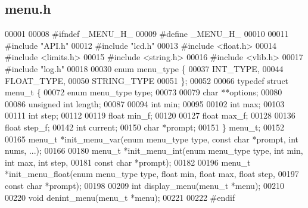 \subsection{menu.\+h}
\label{menu_8h_source}

\begin{DoxyCode}
00001 
00008 \textcolor{preprocessor}{#ifndef \_MENU\_H\_}
00009 \textcolor{preprocessor}{#define \_MENU\_H\_}
00010 
00011 \textcolor{preprocessor}{#include "API.h"}
00012 \textcolor{preprocessor}{#include "lcd.h"}
00013 \textcolor{preprocessor}{#include <float.h>}
00014 \textcolor{preprocessor}{#include <limits.h>}
00015 \textcolor{preprocessor}{#include <string.h>}
00016 \textcolor{preprocessor}{#include <vlib.h>}
00017 \textcolor{preprocessor}{#include "log.h"}
00018 
00030 \textcolor{keyword}{enum} menu_type \{
00037   INT_TYPE,
00044   FLOAT_TYPE,
00050   STRING_TYPE
00051 \};
00052 
00066 \textcolor{keyword}{typedef} \textcolor{keyword}{struct }menu_t \{
00072   \textcolor{keyword}{enum} menu_type type;
00073 
00079   \textcolor{keywordtype}{char} **options;
00080 
00086   \textcolor{keywordtype}{unsigned} \textcolor{keywordtype}{int} length;
00087 
00094   \textcolor{keywordtype}{int} min;
00095 
00102   \textcolor{keywordtype}{int} max;
00103 
00111   \textcolor{keywordtype}{int} step;
00112 
00119   \textcolor{keywordtype}{float} min_f;
00120 
00127   \textcolor{keywordtype}{float} max_f;
00128 
00136   \textcolor{keywordtype}{float} step_f;
00142   \textcolor{keywordtype}{int} current;
00150   \textcolor{keywordtype}{char} *prompt;
00151 \} menu_t;
00152 
00165 menu_t *init_menu_var(\textcolor{keyword}{enum} menu_type type, \textcolor{keyword}{const} \textcolor{keywordtype}{char} *prompt, \textcolor{keywordtype}{int} nums, ...);
00166 
00180 menu_t *init_menu_int(\textcolor{keyword}{enum} menu_type type, \textcolor{keywordtype}{int} min, \textcolor{keywordtype}{int} max, \textcolor{keywordtype}{int} step,
00181                       \textcolor{keyword}{const} \textcolor{keywordtype}{char} *prompt);
00182 
00196 menu_t *init_menu_float(\textcolor{keyword}{enum} menu_type type, \textcolor{keywordtype}{float} min, \textcolor{keywordtype}{float} max, \textcolor{keywordtype}{float} step,
00197                         \textcolor{keyword}{const} \textcolor{keywordtype}{char} *prompt);
00198 
00209 \textcolor{keywordtype}{int} display_menu(menu_t *menu);
00210 
00220 \textcolor{keywordtype}{void} denint_menu(menu_t *menu);
00221 
00222 \textcolor{preprocessor}{#endif}
\end{DoxyCode}

